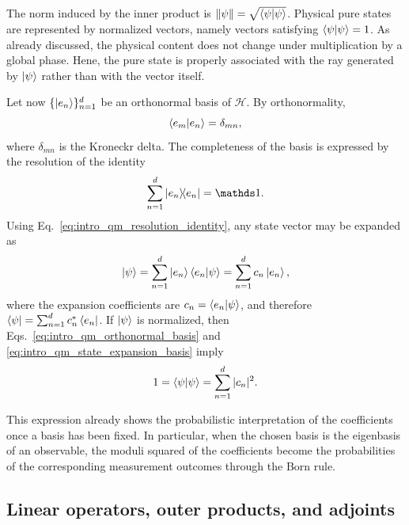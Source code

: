 The norm induced by the inner product is $\|\psi\|=\sqrt{\braket{\psi}{\psi}}$. Physical pure states are represented by normalized vectors, namely vectors satisfying $\braket{\psi}{\psi}=1$. As already discussed, the physical content does not change under multiplication by a global phase. Hene, the pure state is properly associated with the ray generated by $\ket{\psi}$ rather than with the vector itself.

Let now $\{\ket{e_n}\}_{n=1}^d$ be an orthonormal basis of $\mathcal{H}$. By orthonormality,
\begin{equation}
	\braket{e_m}{e_n}=\delta_{mn},
	\label{eq:intro_qm_orthonormal_basis}
\end{equation}
where $\delta_{mn}$ is the Kroneckr delta. The completeness of the basis is expressed by the resolution of the identity
\begin{equation}
	\sum_{n=1}^{d}\dyad{e_n}{e_n}=\id.
	\label{eq:intro_qm_resolution_identity}
\end{equation}
Using Eq.~\eqref{eq:intro_qm_resolution_identity}, any state vector may be expanded as
\begin{equation}
	\ket{\psi}
	=
	\sum_{n=1}^{d}\ket{e_n}\braket{e_n}{\psi}
	=
	\sum_{n=1}^{d} c_n \ket{e_n},
	\label{eq:intro_qm_state_expansion_basis}
\end{equation}
where the expansion coefficients are $c_n=\braket{e_n}{\psi}$, and therefore $\bra{\psi}=\sum_{n=1}^{d} c_n^* \bra{e_n}$. If $\ket{\psi}$ is normalized, then Eqs.~\eqref{eq:intro_qm_orthonormal_basis} and \eqref{eq:intro_qm_state_expansion_basis} imply
\begin{equation}
	1=\braket{\psi}{\psi}=\sum_{n=1}^{d}|c_n|^2.
	\label{eq:intro_qm_normalization_coefficients}
\end{equation}

This expression already shows the probabilistic interpretation of the coefficients once a basis has been fixed. In particular, when the chosen basis is the eigenbasis of an observable, the moduli squared of the coefficients become the probabilities of the corresponding measurement outcomes through the Born rule.

\subsection{Linear operators, outer products, and adjoints}

